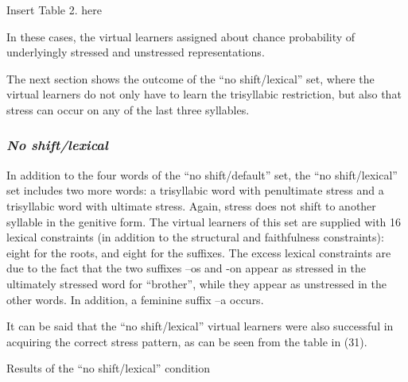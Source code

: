 \documentclass[a4paper]{article}
\begin{document}
{\centering
Insert Table 2. here
\par}


In these cases, the virtual learners assigned about chance probability of underlyingly stressed and unstressed representations.

The next section shows the outcome of the “no shift/lexical” set, where the virtual learners do not only have to learn the trisyllabic restriction, but also that stress can occur on any of the last three syllables.

\subsubsection{
\textit{No shift}\textit{/lexical}}

In addition to the four words of the “no shift/default” set, the “no shift/lexical” set includes two more words: a trisyllabic word with penultimate stress and a trisyllabic word with ultimate stress. Again, stress does not shift to another syllable in the genitive form. The virtual learners of this set are supplied with 16 lexical constraints (in addition to the structural and faithfulness constraints): eight for the roots, and eight for the suffixes. The excess lexical constraints are due to the fact that the two suffixes –os and \nobreakdash-on appear as stressed in the ultimately stressed word for “brother”, while they appear as unstressed in the other words. In addition, a feminine suffix –a occurs.

It can be said that the “no shift/lexical” virtual learners were also successful in acquiring the correct stress pattern, as can be seen from the table in (31).

\ea Results of the “no shift/lexical” condition
\end{document}
